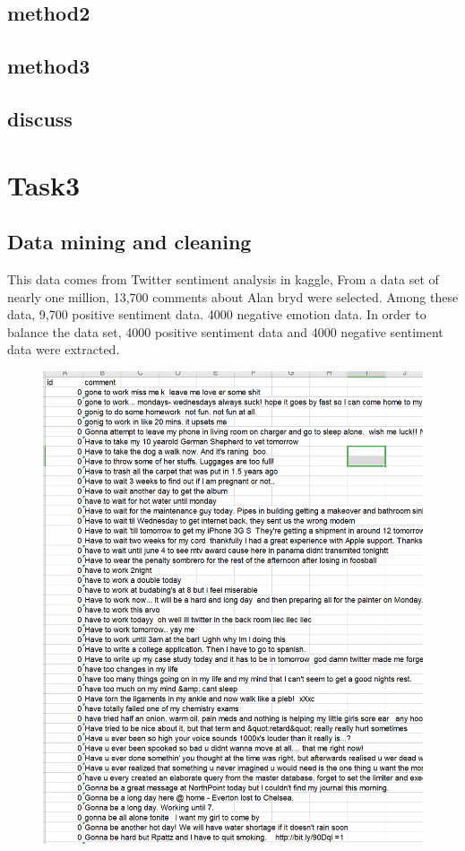 \documentclass{article}
\begin{document}
\subsection{method2}
\subsection{method3}
\subsection{discuss}
\section{Task3}
\subsection{Data mining and cleaning}
This data comes from Twitter sentiment analysis in kaggle, From a data set of nearly one million, 13,700 comments about Alan bryd were selected. Among these data, 9,700 positive sentiment data. 4000 negative emotion data. In order to balance the data set, 4000 positive sentiment data and 4000 negative sentiment data were extracted.
 \begin{figure}[H]
\centering
  \includegraphics[width=.8\textwidth]{3-1.png} %

\end{figure}
\end{document}
